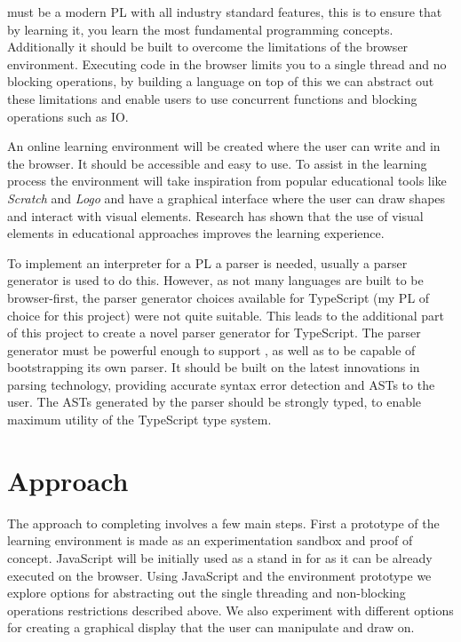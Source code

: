 \Setanta{} must be a modern PL with all industry standard features, this is to ensure that by learning it, you learn the most fundamental programming concepts. Additionally it should be built to overcome the limitations of the browser environment. Executing code in the browser limits you to a single thread and no blocking operations, by building a language on top of this we can abstract out these limitations and enable users to use concurrent functions and blocking operations such as IO.

An online learning environment will be created where the user can write and \Setanta{} in the browser. It should be accessible and easy to use. To assist in the learning process the environment will take inspiration from popular educational tools like \emph{Scratch} and \emph{Logo} and have a graphical interface where the user can draw shapes and interact with visual elements. Research has shown that the use of visual elements in educational approaches improves the learning experience\cite{graphiclearning}.

To implement an interpreter for a PL a parser is needed, usually a parser generator is used to do this. However, as not many languages are built to be browser-first, the parser generator choices available for TypeScript (my PL of choice for this project) were not quite suitable. This leads to the additional part of this project to create a novel parser generator for TypeScript. The parser generator must be powerful enough to support \Setanta{}, as well as to be capable of bootstrapping its own parser. It should be built on the latest innovations in parsing technology, providing accurate syntax error detection and ASTs to the user. The ASTs generated by the parser should be strongly typed, to enable maximum utility of the TypeScript type system.

\section{Approach}
The approach to completing involves a few main steps. First a prototype of the learning environment is made as an experimentation sandbox and proof of concept. JavaScript will be initially used as a stand in for \Setanta{} as it can be already executed on the browser. Using JavaScript and the environment prototype we explore options for abstracting out the single threading and non-blocking operations restrictions described above. We also experiment with different options for creating a graphical display that the user can manipulate and draw on.

